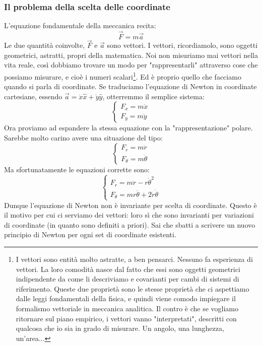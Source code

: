 \documentclass[a4paper,openany]{article}
\begin{document}
	\subsubsection{Il problema della scelta delle coordinate}
	L'equazione fondamentale della meccanica recita:
	\begin{equation}
		\vec{F} = m\vec{a}
	\end{equation}
	Le due quantità coinvolte, $\vec{F}$ e $\vec{a}$ sono vettori. I vettori, ricordiamolo, sono oggetti geometrici, astratti, propri della matematica. Noi non misuriamo mai vettori nella vita reale, così dobbiamo trovare un modo per "rappresentarli" attraverso cose che possiamo misurare, e cioè i numeri scalari\footnote{I vettori sono entità molto astratte, a ben pensarci. Nessuno fa esperienza di vettori. La loro comodità nasce dal fatto che essi sono oggetti geometrici indipendente da come li descriviamo e covarianti per cambi di sistemi di riferimento. Queste due proprietà sono le stesse proprietà che ci aspettiamo dalle leggi fondamentali della fisica, e quindi viene comodo impiegare il formalismo vettoriale in meccanica analitica. Il contro è che se vogliamo ritornare sul piano empirico, i vettori vanno "interpretati", descritti con qualcosa che io sia in grado di misurare. Un angolo, una lunghezza, un'area...}. Ed è proprio quello che facciamo quando si parla di coordinate. Se traduciamo l'equazione di Newton in coordinate cartesiane, essendo $\vec{a} = \ddot{x}\hat{x}+\ddot{y}\hat{y}$, otterremmo il semplice sistema:
	\begin{equation}
		\begin{cases}
			F_{x} = m\ddot{x} \\
			F_{y} = m\ddot{y} 
		\end{cases}
	\end{equation}
	Ora proviamo ad espandere la stessa equazione con la "rappresentazione" polare. Sarebbe molto carino avere una situazione del tipo:
	\begin{equation}
		\begin{cases}
			F_{r} = m\ddot{r} \\
			F_{\theta} = m\ddot{\theta} 
		\end{cases}
	\end{equation}
	Ma sfortunatamente le equazioni corrette sono:
	\begin{equation}
		\begin{cases}
			F_{r} = m\ddot{r} - r\dot{\theta}^{2} \\
			F_{\theta} = mr\ddot{\theta} + 2\dot{r}\dot{\theta}
		\end{cases}
		\label{EQNewtonrt}
	\end{equation}
	Dunque l'equazione di Newton non è invariante per scelta di coordinate. Questo è il motivo per cui ci serviamo dei vettori: loro sì che sono invarianti per variazioni di coordinate (in quanto sono definiti a priori). Sai che sbatti a scrivere un nuovo principio di Newton per ogni set di coordinate esistenti.
	
\end{document}
